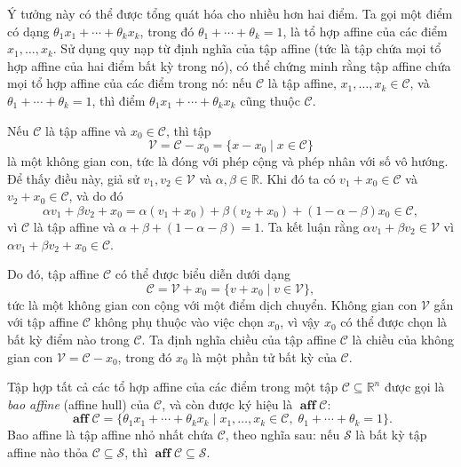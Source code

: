 Ý tưởng này có thể được tổng quát hóa cho nhiều hơn hai điểm. Ta gọi một điểm có dạng
$\theta_1 x_1 + \cdots + \theta_k x_k$, trong đó $\theta_1 + \cdots + \theta_k = 1$, là tổ hợp affine của các điểm $x_1, \ldots, x_k$. Sử dụng quy nạp từ định nghĩa của tập affine (tức là tập chứa mọi tổ hợp affine của hai điểm bất kỳ trong nó), có thể chứng minh rằng tập affine chứa mọi tổ hợp affine của các điểm trong nó: nếu $\mathcal{C}$ là tập affine, $x_1, \ldots, x_k \in \mathcal{C}$, và $\theta_1 + \cdots + \theta_k = 1$, thì điểm $\theta_1 x_1 + \cdots + \theta_k x_k$ cũng thuộc $\mathcal{C}$.

\noindent Nếu $\mathcal{C}$ là tập affine và $x_0 \in \mathcal{C}$, thì tập
\begin{equation}
    \mathcal{V} = \mathcal{C} - x_0 = \{x - x_0 \mid x \in \mathcal{C}\}
\end{equation}
là một không gian con, tức là đóng với phép cộng và phép nhân với số vô hướng. Để thấy điều này, giả sử $v_1, v_2 \in \mathcal{V}$ và $\alpha, \beta \in \mathbb{R}$. Khi đó ta có $v_1 + x_0 \in \mathcal{C}$ và $v_2 + x_0 \in \mathcal{C}$, và do đó
\begin{equation}
    \alpha v_1 + \beta v_2 + x_0 = \alpha(v_1 + x_0) + \beta(v_2 + x_0) + (1-\alpha-\beta)x_0 \in \mathcal{C},
\end{equation}
vì $\mathcal{C}$ là tập affine và $\alpha + \beta + (1-\alpha-\beta) = 1$. Ta kết luận rằng $\alpha v_1 + \beta v_2 \in \mathcal{V}$ vì $\alpha v_1 + \beta v_2 + x_0 \in \mathcal{C}$.

\noindent Do đó, tập affine $\mathcal{C}$ có thể được biểu diễn dưới dạng
\begin{equation}
    \mathcal{C} = \mathcal{V} + x_0 = \{v + x_0 \mid v \in \mathcal{V}\},
\end{equation}
tức là một không gian con cộng với một điểm dịch chuyển. Không gian con $\mathcal{V}$ gắn với tập affine $\mathcal{C}$ không phụ thuộc vào việc chọn $x_0$, vì vậy $x_0$ có thể được chọn là bất kỳ điểm nào trong $\mathcal{C}$. Ta định nghĩa chiều của tập affine $\mathcal{C}$ là chiều của không gian con $\mathcal{V} = \mathcal{C} - x_0$, trong đó $x_0$ là một phần tử bất kỳ của $\mathcal{C}$.

Tập hợp tất cả các tổ hợp affine của các điểm trong một tập \( \mathcal{C} \subseteq \mathbb{R}^n \)
được gọi là \textit{bao affine} (affine hull) của \( \mathcal{C} \), và còn được ký hiệu là \( \operatorname{\textbf{aff}} \mathcal{C} \):
\[
\operatorname{\textbf{aff}} \mathcal{C} = \{ \theta_1 x_1 + \cdots + \theta_k x_k \mid x_1, \ldots, x_k \in \mathcal{C},\; \theta_1 + \cdots + \theta_k = 1 \}.
\]
Bao affine là tập affine nhỏ nhất chứa \( \mathcal{C} \), theo nghĩa sau:
nếu \( \mathcal{S} \) là bất kỳ tập affine nào thỏa \( \mathcal{C} \subseteq \mathcal{S} \),
thì \( \operatorname{\textbf{aff}} \mathcal{C} \subseteq \mathcal{S} \).

